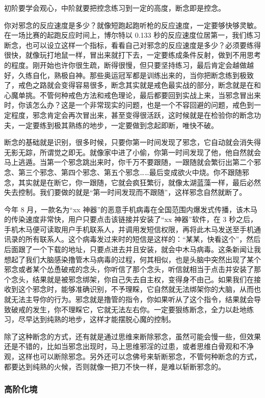 初阶要学会观心，中阶就要把控念练习到一定的高度，断念即是控念。

你对邪念的反应速度是多少？就像短跑起跑听枪的反应速度，一定要够快够灵敏。在一场比赛的起跑反应时间上，博尔特以 0.133 秒的反应速度位居第一，我们练习断念，也可以设立这样一个指标，看看自己对邪念的反应速度是多少？必须要练得很快，就像玩打地鼠一样，冒出来就打下去，一定要练成条件反射，做到不用思考的程度。刚开始也许你很生疏，断得很慢，但只要坚持练习，最后肯定会越做越好，久练自化，熟极自神。那些奥运冠军都是训练出来的，当你把断念练到极致了，戒色之路就会变得容易很多，断念其实就是戒色最实战的部分，断念就是在和心魔单挑。不管何种戒色方法和戒色理论，最后都要回到实战上来，当邪念冒出来时，你该怎么办？这是一个非常现实的问题，也是一个不容回避的问题，戒色到一定程度，邪念肯定会再次冒出来，甚至变得很活跃，这时候就是在检验你的断念功夫，一定要练到极其熟练的地步，一定要做到念起即断，唯快不破。

断念的基础就是识别，很多时候，只要你第一时间发现了邪念，它自动就会消失得无影无踪，所谓觉之即无。就像家中进了小偷，你第一时间发现了他，他自然就会马上逃遁。当第一个邪念跳出来时，你千万不要跟随，一跟随就会繁衍出第二个邪念、第三个邪念、第四个邪念、第五个邪念……最后变成欲火中烧。你不跟随邪念，其实就是在断它，你一跟随，它就会疯狂繁衍，就像太湖蓝藻一样，最后必然失去控制。我们要做的就是“第一时间发现而不跟随”，这样邪念自然就断了。

今年 8 月，一款名为“xx 神器”的恶意手机病毒在全国范围内爆发式传播，该木马的传染速度非常快，用户只要点击该链接并安装了“xx 神器”软件，在 3 秒之后，手机木马便可读取用户手机联系人，并调用发短信权限，再将此木马发送至手机通讯录的所有联系人。这个病毒发过来时的短信是这样的：“某某，快看这个”，然后后面跟了一个下载的地址，只要点进去并且安装，就会中木马病毒。这条新闻让我想起了我们大脑感染撸管木马病毒的过程，何其相似，也是头脑中突然出现了某个邪念或者某个怂恿破戒的念头，你听信了那个念头，听信就相当于点击并安装了那个念头，结果就是被邪念绑架，你自己失去自主权，变得身不由己。如果我们在接收到这个邪念时，能够准确识别，不予理睬，它自然就无法绑架你的大脑，从而也就无法主导你的行为。邪念就是撸管的指令，你如果听从了这个指令，结果就会导致破戒的发生，你不理睬它，它就无法左右你。一定要狠练断念，全力以赴地练习，尽早达到纯熟的地步，这样才能摆脱心魔的控制。

除了这种断念的方式，还有就是通过思维来断除邪念，虽然可能会慢一些，但效果还是不错的，比如当邪念出现时，马上思维邪淫的过患，或者思维白骨观和不净观，这样也可以断除邪念。另外还可以念佛号来斩断邪念，不管何种断念的方式，都要达到纯熟的火候，否则就像一把刀不快一样，是难以斩断邪念的。

\subsubsection{高阶化境}

